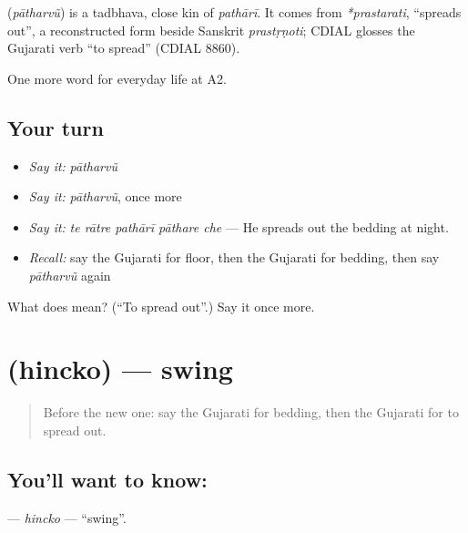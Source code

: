 \begin{cousinweb}
\textbf{} (\emph{pātharvũ}) is a tadbhava, close kin of \emph{pathārī}. It comes from \emph{*prastarati}, \textquotedblleft{}spreads out\textquotedblright{}, a reconstructed form beside Sanskrit \emph{prastṛṇoti}; CDIAL glosses the Gujarati verb \textquotedblleft{}to spread\textquotedblright{} (CDIAL 8860).
\end{cousinweb}

\begin{grammarlens}[title={What you've built}]
One more word for everyday life at A2.
\end{grammarlens}

\subsection*{Your turn}
\begin{itemize}
\raggedright
  \item \emph{Say it:} \emph{pātharvũ}
  \item \emph{Say it:} \emph{pātharvũ}, once more
  \item \emph{Say it:} \emph{te rātre pathārī pāthare che} — He spreads out the bedding at night.
  \item \emph{Recall:} say the Gujarati for floor, then the Gujarati for bedding, then say \emph{pātharvũ} again
\end{itemize}

\begin{tcolorbox}[breakable,colback=teal!4,colframe=teal!35!black,title={Before you move on}]
What does  mean? (\textquotedblleft{}To spread out\textquotedblright{}.) Say it once more.
\end{tcolorbox}
\section[\texorpdfstring{\gu{હિંચકો} (hincko)}{હિંચકો (hincko)}]{ (hincko) — swing}

\label{lesson:GU-C160-hincko}



\begin{quote}
Before the new one: say the Gujarati for bedding, then the Gujarati for to spread out.
\end{quote}

\subsection*{You'll want to know: }
\textbf{} — \emph{hincko} — \textquotedblleft{}swing\textquotedblright{}.

